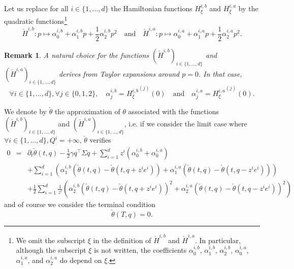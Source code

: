 \documentclass[preprint, 3p]{elsarticle}
\newcommand{\1}{{\chi}}
\newtheorem{remark}{Remark}
\begin{document}
Let us replace for all $i \in \{1, \ldots, d\}$ the Hamiltonian functions $H_\xi^{i,b}$ and $H_ \xi^{i,a}$ by the quadratic functions\footnote{We omit the subscript $\xi$ in the definition of $\check{H}^{i,b}$ and $\check{H}^{i,a}$. In particular, although the subscript $\xi$ is not written, the coefficients  $\alpha^{i,b}_0$, $\alpha^{i,b}_1$, $\alpha^{i,b}_2$, $\alpha^{i,a}_0$, $\alpha^{i,a}_1$, and $\alpha^{i,a}_2$ do depend on $\xi$.}
$$\check{H}^{i,b}: p \mapsto  \alpha^{i,b}_0 + \alpha^{i,b}_1 p + \frac 12 \alpha^{i,b}_2 p^2 \quad \textrm{and} \quad \check{H}^{i,a}: p \mapsto  \alpha^{i,a}_0 + \alpha^{i,a}_1 p + \frac 12 \alpha^{i,a}_2 p^2.$$

\begin{remark}
\label{naturalchoice}
A natural choice for the functions $(\check{H}^{i,b})_{i \in \{1, \ldots, d\}}$ and $(\check{H}^{i,a})_{i \in \{1, \ldots, d\}}$ derives from Taylor expansions around $p=0$. In that case,
$$\forall i \in \{1, \ldots, d\},  \forall j \in \{0,1,2\},\quad  \alpha^{i,b}_j = {H^{i,b}_\xi}^{(j)}(0) \quad \textrm{and} \quad \alpha^{i,a}_j = {H^{i,a}_\xi}^{(j)}(0).$$
\end{remark}


We denote by $\check \theta$ the approximation of $\theta$ associated with the functions $(\check{H}^{i,b})_{i \in \{1, \ldots, d\}}$ and $(\check{H}^{i,a})_{i \in \{1, \ldots, d\}}$, i.e. if we consider the limit case where $\forall i \in \{1, \ldots, d\}, Q^i = +\infty$, $\check \theta$ verifies
\begin{eqnarray}
0 &=& \partial_t \check{\theta}(t,q) - \frac{1}{2} \gamma q^\intercal \Sigma q
	+ \sum_{i=1}^d z^i\left( \alpha^{i,b}_0 + \alpha^{i,a}_0 \right) \nonumber \\
  &&+ \sum_{i=1}^d \left( \alpha^{i,b}_1 \left(\check{\theta}(t,q) - \check{\theta}(t, q + z^ie^i)\right)
                     + \alpha^{i,a}_1 \left(\check{\theta}(t,q) - \check{\theta}(t, q - z^ie^i)\right) \right) \nonumber \\
  &&+ \frac{1}{2}\sum_{i=1}^d \frac 1{z^i}\left( \alpha^{i,b}_2 \left(\check{\theta}(t,q) - \check{\theta}(t,q + z^ie^i)\right)^2
                                + \alpha^{i,a}_2 \left(\check{\theta}(t,q) - \check{\theta}(t,q - z^ie^i)\right)^2 \right) \label{sec3:thetagenapprox}
\end{eqnarray}
and of course we consider the terminal condition
\begin{equation}
	\label{sec3:thetagenapproxCT}
	\check{\theta}(T,q) = 0.
\end{equation}
\end{document}
